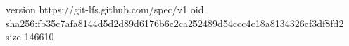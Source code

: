 version https://git-lfs.github.com/spec/v1
oid sha256:fb35c7afa8144d5d2d89d6176b6c2ca252489d54ccc4c18a8134326cf3df8fd2
size 146610
